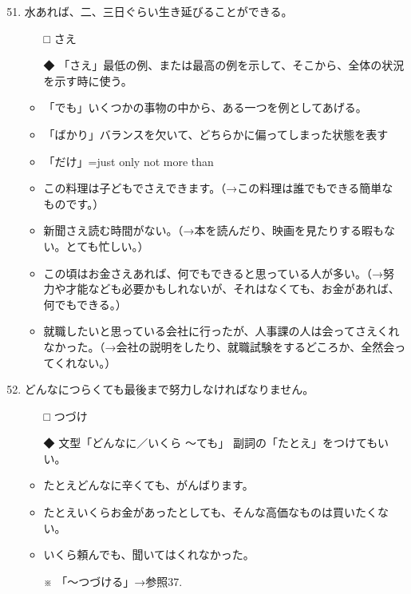 \documentclass[
uplatex,
b5paper,
10pt,
dvipdfmx
]{jsbook}
\begin{document}
\begin{enumerate}
\setcounter{enumi}{50}

\item 水\underline{\hspace{3zw}}あれば、二、三日ぐらい生き延びることができる。
\begin{itemize}
\item[□] さえ
\item[◆] 「さえ」最低の例、または最高の例を示して、そこから、全体の状況
	  を示す時に使う。
\end{itemize}
\begin{itemize}
 \item 「でも」いくつかの事物の中から、ある一つを例としてあげる。
 \item 「ばかり」バランスを欠いて、どちらかに偏ってしまった状態を表す
 \item 「だけ」=just only not more than 
\end{itemize}
\begin{itemize}
 \item この料理は子どもでさえできます。（→この料理は誰でもできる簡単な
       ものです。）
 \item 新聞さえ読む時間がない。（→本を読んだり、映画を見たりする暇もな
       い。とても忙しい。）
 \item この頃はお金さえあれば、何でもできると思っている人が多い。（→努
       力や才能なども必要かもしれないが、それはなくても、お金があれば、
       何でもできる。）
 \item 就職したいと思っている会社に行ったが、人事課の人は会ってさえくれ
       なかった。（→会社の説明をしたり、就職試験をするどころか、全然会っ
       てくれない。）
\end{itemize}

\item どんなにつらくても最後まで努力し\underline{\hspace{3zw}}なければなりません。
\begin{itemize}
\item[□] つづけ
\item[◆] 文型「どんなに／いくら 〜ても」 副詞の「たとえ」をつけてもいい。
\end{itemize}
\begin{itemize}
\item たとえどんなに辛くても、がんばります。
\item たとえいくらお金があったとしても、そんな高価なものは買いたくない。
\item いくら頼んでも、聞いてはくれなかった。
\item[※] 「〜つづける」→参照37.
\end{itemize}


\end{enumerate}
\end{document}

